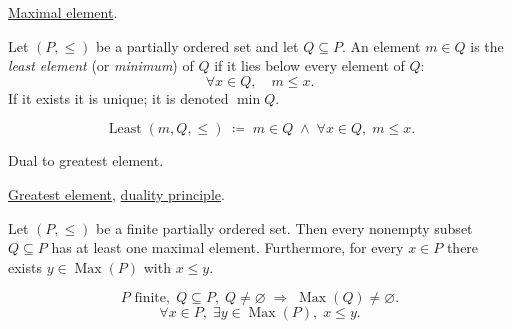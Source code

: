 \begin{remark*}[Dependencies]
\hyperref[def:maximal-element]{Maximal element}.
\end{remark*}


\begin{definition}
\label{def:least-element}
Let $(P, \leq)$ be a partially ordered set and let $Q \subseteq P$.  An
element $m \in Q$ is the \emph{least element} (or \emph{minimum}) of $Q$
if it lies below every element of $Q$:
\[
\forall x \in Q, \quad m \leq x.
\]
If it exists it is unique; it is denoted $\min Q$.
\end{definition}

\begin{remark*}
\[
\operatorname{Least}(m, Q, \leq)
\;\coloneqq\;
m \in Q \;\land\; \forall x \in Q,\; m \leq x.
\]
\end{remark*}

\begin{remark*}[Interpretation]
Dual to greatest element.
\end{remark*}

\begin{remark*}[Dependencies]
\hyperref[def:greatest-element]{Greatest element},
\hyperref[prop:duality-principle]{duality principle}.
\end{remark*}


\begin{proposition}
\label{prop:finite-poset-maximal}
Let $(P, \leq)$ be a finite partially ordered set.  Then every nonempty
subset $Q \subseteq P$ has at least one maximal element.  Furthermore,
for every $x \in P$ there exists $y \in \operatorname{Max}(P)$ with
$x \leq y$.
\end{proposition}

\begin{remark*}
\[
P \text{ finite},\; Q \subseteq P,\; Q \neq \varnothing
\;\Longrightarrow\;
\operatorname{Max}(Q) \neq \varnothing.
\]
\[
\forall x \in P,\; \exists y \in \operatorname{Max}(P),\; x \leq y.
\]
\end{remark*}


